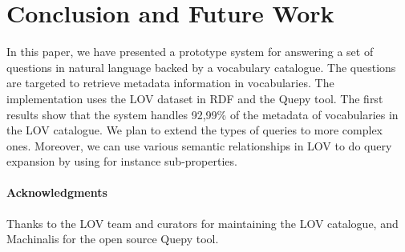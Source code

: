 \documentclass[runningheads,a4paper]{llncs}
\begin{document}




\section{Conclusion and Future Work}
\label{sec:conclusion}
%

In this paper, we have presented a prototype system for answering a set of questions in natural language backed by a vocabulary catalogue. The questions are targeted to retrieve metadata information in vocabularies. 
 The implementation uses the LOV dataset in RDF and the Quepy tool. The first results show that the system handles 92,99\% of the metadata of vocabularies in the LOV catalogue.
We plan to extend the types of queries to more complex ones. Moreover, we can use various semantic relationships in LOV to do query expansion by using for instance sub-properties. 

\paragraph{\textbf{Acknowledgments}} %
Thanks to the LOV team and curators for maintaining the LOV catalogue, and Machinalis for the open source Quepy tool. 




\end{document}
